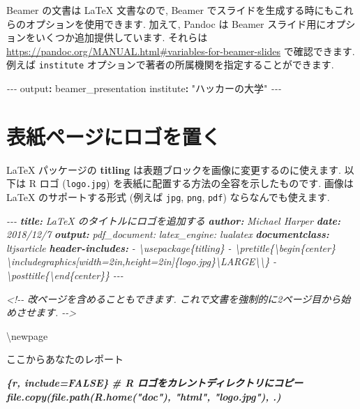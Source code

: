 \documentclass[
  11pt,
  lualatex,
  ja=standard]{bxjsreport}
\newenvironment{Shaded}{\begin{snugshade}}{\end{snugshade}}
\newcommand{\AnnotationTok}[1]{\textcolor[rgb]{0.56,0.35,0.01}{\textbf{\textit{#1}}}}
\newcommand{\AttributeTok}[1]{\textcolor[rgb]{0.77,0.63,0.00}{#1}}
\newcommand{\CommentTok}[1]{\textcolor[rgb]{0.56,0.35,0.01}{\textit{#1}}}
\newcommand{\FunctionTok}[1]{\textcolor[rgb]{0.00,0.00,0.00}{#1}}
\newcommand{\InformationTok}[1]{\textcolor[rgb]{0.56,0.35,0.01}{\textbf{\textit{#1}}}}
\newcommand{\KeywordTok}[1]{\textcolor[rgb]{0.13,0.29,0.53}{\textbf{#1}}}
\newcommand{\NormalTok}[1]{#1}
\newcommand{\PreprocessorTok}[1]{\textcolor[rgb]{0.56,0.35,0.01}{\textit{#1}}}
\newcommand{\StringTok}[1]{\textcolor[rgb]{0.31,0.60,0.02}{#1}}
\begin{document}
Beamer の文書は LaTeX 文書なので, Beamer でスライドを生成する時にもこれらのオプションを使用できます. 加えて, Pandoc は Beamer スライド用にオプションをいくつか追加提供しています. それらは \url{https://pandoc.org/MANUAL.html\#variables-for-beamer-slides} で確認できます. 例えば \texttt{institute} オプションで著者の所属機関を指定することができます.

\begin{Shaded}
\begin{Highlighting}[]
\PreprocessorTok{{-}{-}{-}}
\FunctionTok{output}\KeywordTok{:}\AttributeTok{ beamer\_presentation}
\FunctionTok{institute}\KeywordTok{:}\AttributeTok{ }\StringTok{"ハッカーの大学"}
\PreprocessorTok{{-}{-}{-}}
\end{Highlighting}
\end{Shaded}

\hypertarget{latex-logo}{%
\section{表紙ページにロゴを置く}\label{latex-logo}}

LaTeX パッケージの \textbf{titling}  は表題ブロックを画像に変更するのに使えます. 以下は R ロゴ (\texttt{logo.jpg}) を表紙に配置する方法の全容を示したものです. 画像は LaTeX のサポートする形式 (例えば \texttt{jpg}, \texttt{png}, \texttt{pdf}) ならなんでも使えます.

\begin{Shaded}
\begin{Highlighting}[]
\CommentTok{{-}{-}{-}}
\AnnotationTok{title:}\CommentTok{ LaTeX のタイトルにロゴを追加する}
\AnnotationTok{author:}\CommentTok{ Michael Harper}
\AnnotationTok{date:}\CommentTok{ 2018/12/7}
\AnnotationTok{output:}
\CommentTok{  pdf\_document:}
\CommentTok{    latex\_engine: lualatex}
\AnnotationTok{documentclass:}\CommentTok{ ltjsarticle}
\AnnotationTok{header{-}includes:}
\CommentTok{  {-} \textbackslash{}usepackage\{titling\}}
\CommentTok{  {-} \textbackslash{}pretitle\{\textbackslash{}begin\{center\}}
\CommentTok{    \textbackslash{}includegraphics[width=2in,height=2in]\{logo.jpg\}\textbackslash{}LARGE\textbackslash{}\textbackslash{}\}}
\CommentTok{  {-} \textbackslash{}posttitle\{\textbackslash{}end\{center\}\}}
\CommentTok{{-}{-}{-}}

\CommentTok{\textless{}!{-}{-} 改ページを含めることもできます. これで文書を強制的に2ページ目から始めさせます. {-}{-}\textgreater{}}

\NormalTok{\textbackslash{}newpage}

\NormalTok{ここからあなたのレポート}

\InformationTok{\textasciigrave{}\textasciigrave{}\textasciigrave{}\{r, include=FALSE\}}
\InformationTok{\# R ロゴをカレントディレクトリにコピー}
\InformationTok{file.copy(file.path(R.home("doc"), "html", "logo.jpg"), \textquotesingle{}.\textquotesingle{})}
\InformationTok{\textasciigrave{}\textasciigrave{}\textasciigrave{}}
\end{Highlighting}
\end{Shaded}
\end{document}
